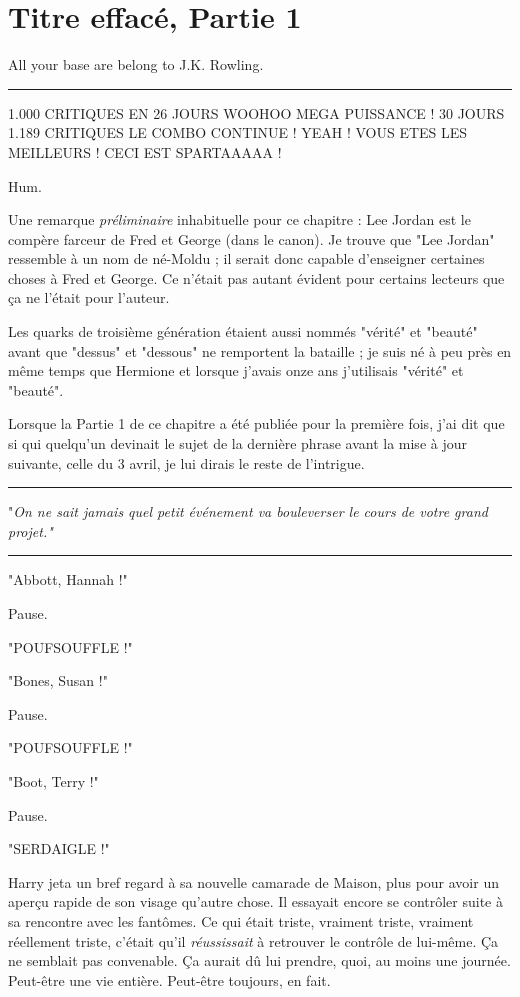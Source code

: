 
\chapter{Titre effacé, Partie 1}

All your base are belong to J.K. Rowling.
\par\noindent\rule{\textwidth}{0.4pt}
1.000 CRITIQUES EN 26 JOURS WOOHOO MEGA PUISSANCE ! 30 JOURS 1.189 CRITIQUES LE COMBO CONTINUE ! YEAH ! VOUS ETES LES MEILLEURS ! CECI EST SPARTAAAAA !

Hum.

Une remarque \emph{préliminaire}  inhabituelle pour ce chapitre : Lee Jordan est le compère farceur de Fred et George (dans le canon). Je trouve que "Lee Jordan" ressemble à un nom de né-Moldu ; il serait donc capable d'enseigner certaines choses à Fred et George. Ce n'était pas autant évident pour certains lecteurs que ça ne l'était pour l'auteur.

Les quarks de troisième génération étaient aussi nommés "vérité" et "beauté" avant que "dessus" et "dessous" ne remportent la bataille ; je suis né à peu près en même temps que Hermione et lorsque j'avais onze ans j'utilisais "vérité" et "beauté".

Lorsque la Partie 1 de ce chapitre a été publiée pour la première fois, j'ai dit que si qui quelqu'un devinait le sujet de la dernière phrase avant la mise à jour suivante, celle du 3 avril, je lui dirais le reste de l'intrigue.
\par\noindent\rule{\textwidth}{0.4pt}
"\emph{On ne sait jamais quel petit événement va bouleverser le cours de votre grand projet."} 
\par\noindent\rule{\textwidth}{0.4pt}
"Abbott, Hannah !"

Pause.

"POUFSOUFFLE !"

"Bones, Susan !"

Pause.

"POUFSOUFFLE !"

"Boot, Terry !"

Pause.

"SERDAIGLE !"

Harry jeta un bref regard à sa nouvelle camarade de Maison, plus pour avoir un aperçu rapide de son visage qu'autre chose. Il essayait encore se contrôler suite à sa rencontre avec les fantômes. Ce qui était triste, vraiment triste, vraiment réellement triste, c'était qu'il \emph{réussissait}  à retrouver le contrôle de lui-même. Ça ne semblait pas convenable. Ça aurait dû lui prendre, quoi, au moins une journée. Peut-être une vie entière. Peut-être toujours, en fait.

